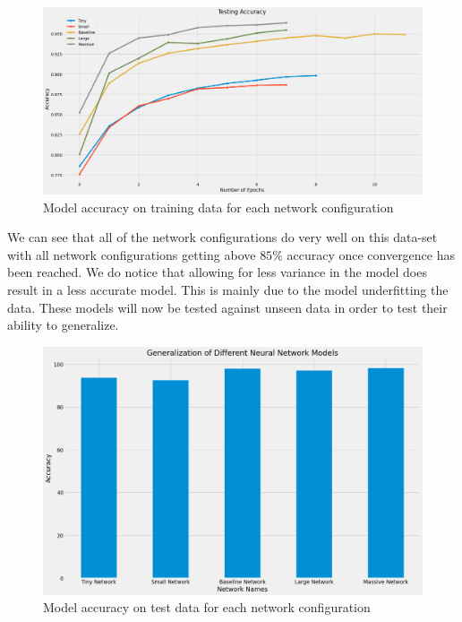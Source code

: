 \documentclass[a4paper,twoside,10pt]{article}
\begin{document}
\begin{figure}[H]
    \centering
    \includegraphics[scale=0.3]{Multiple Model Accuracy}
    \caption{Model accuracy on training data for each network configuration}
    \label{fig:nn_model_accuracy}
\end{figure}

We can see that all of the network configurations do very well on this data-set with all network configurations getting above $85\%$ accuracy once convergence has been reached. We do notice that allowing for less variance in the model does result in a less accurate model. This is mainly due to the model underfitting the data. These models will now be tested against unseen data in order to test their ability to generalize. 

\begin{figure}[H]
    \centering
    \includegraphics[scale=0.3]{NN_test_Generalization}
    \caption{Model accuracy on test data for each network configuration}
    \label{fig:nn_test_generalization}
\end{figure}
\end{document}
